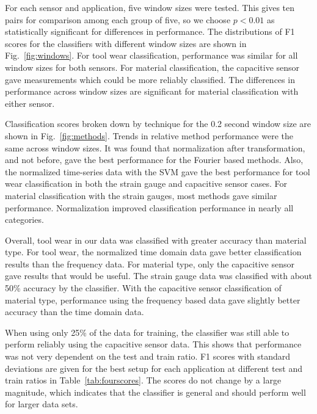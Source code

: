 For each sensor and application, five window sizes were tested. 
This gives ten pairs for comparison among each group of five, 
 so we choose $p<0.01$ as statistically significant for differences in performance.
The distributions of F1 scores for the classifiers with different window sizes are shown in Fig.~\ref{fig:windows}.
For tool wear classification, performance was similar for all window sizes for both sensors.
For material classification, the capacitive sensor gave measurements which could be more reliably classified.
The differences in performance across window sizes are significant for material classification with either sensor.

Classification scores broken down by technique for the 0.2 second window size are shown in Fig.~\ref{fig:methods}.
Trends in relative method performance were the same across window sizes.
It was found that normalization after transformation, and not before, gave the best performance for 
 the Fourier based methods.
Also, the normalized time-series data with the SVM gave the best performance for 
 tool wear classification in both the strain gauge and capacitive sensor cases.
For material classification with the strain gauges, most methods gave similar performance.
Normalization improved classification performance in nearly all categories.

Overall, tool wear in our data was classified with greater accuracy than material type. 
For tool wear, the normalized time domain data gave better classification results than
 the frequency data.
For material type, only the capacitive sensor gave results that would be useful. 
The strain gauge data was classified with about 50\% accuracy by the classifier.
With the capacitive sensor classification of material type, 
performance using the frequency based data gave slightly better accuracy than the time
domain data.

When using only 25\% of the data for training, the classifier was still able to perform
reliably using the capacitive sensor data. 
This shows that performance was not very dependent on the test and train ratio.
F1 scores with standard deviations are given for the best setup for each application 
 at different test and train ratios in Table~\ref{tab:fourscores}.
The scores do not change by a large magnitude, which indicates that 
 the classifier is general and should perform well for larger data sets.

